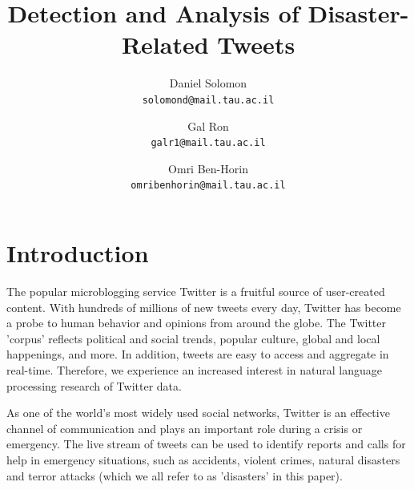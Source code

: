 \documentclass[letterpaper,twocolumn,10pt]{article}
\begin{document}
\date{}

\title{\Large \bf Detection and Analysis of Disaster-Related Tweets}

\author{
{\rm Daniel Solomon}\\
\normalsize{\texttt{solomond@mail.tau.ac.il}}
\and
{\rm Gal Ron}\\
\normalsize{\texttt{galr1@mail.tau.ac.il‬}}
\and
{\rm Omri Ben-Horin}\\
\normalsize{\texttt{omribenhorin@mail.tau.ac.il}}
}

\maketitle

\thispagestyle{empty}


\abstract{}

\begin{center}
	\parbox{200pt}{
	}
\end{center}

\section{Introduction}
The popular microblogging service Twitter is a fruitful source of user-created content. With hundreds of millions of new tweets every day, Twitter has become a probe to human behavior and opinions from around the globe. The Twitter 'corpus' reflects political and social trends, popular culture, global and local happenings, and more. In addition, tweets are easy to access and aggregate in real-time. Therefore, we experience an increased interest in natural language processing research of Twitter data.

As one of the world's most widely used social networks, Twitter is an effective channel of communication and plays an important role during a crisis or emergency. The live stream of tweets can be used to identify reports and calls for help in emergency situations, such as accidents, violent crimes, natural disasters and terror attacks (which we all refer to as 'disasters' in this paper).
\end{document}
